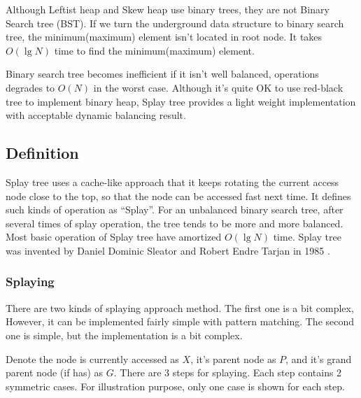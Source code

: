 \documentclass{article}
\begin{document}
Although Leftist heap and Skew heap use binary trees, they
are not Binary Search tree (BST). If we turn the underground
data structure to binary search tree, the minimum(maximum)
element isn't located in root node. It takes $O(\lg N)$ time
to find the minimum(maximum) element.

Binary search tree becomes inefficient if it isn't well
balanced, operations degrades to $O(N)$ in the worst case.
Although it's quite OK to use red-black tree to implement
binary heap, Splay tree provides a light weight implementation
with acceptable dynamic balancing result.

\subsection{Definition}

Splay tree uses a cache-like approach that it keeps rotating the current
access node close to the top, so that the node can be accessed fast
next time. It defines such kinds of operation as ``Splay''. For an 
unbalanced binary search tree, after several times of splay operation, the
tree tends to be more and more balanced. Most basic operation of 
Splay tree have amortized $O(\lg N)$ time. Splay tree was invented
by Daniel Dominic Sleator and Robert Endre Tarjan in 1985\cite{wiki-splay-tree} 
\cite{self-adjusting-trees}.

\subsubsection{Splaying}

There are two kinds of splaying approach method. The first one is
a bit complex, However, it can be implemented fairly simple with
pattern matching. The second one is simple, but the implementation
is a bit complex.

Denote the node is currently accessed as $X$, it's parent node as $P$,
and it's grand parent node (if has) as $G$. There are 3 steps for 
splaying. Each step contains 2 symmetric cases. For illustration 
purpose, only one case is shown for each step.
\end{document}
